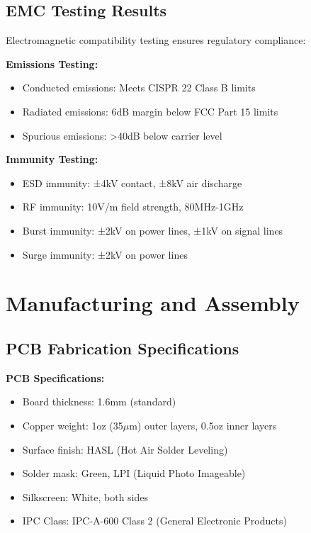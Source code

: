 \subsection{EMC Testing Results}
\label{subsec:emc_testing}

Electromagnetic compatibility testing ensures regulatory compliance:

\textbf{Emissions Testing:}
\begin{itemize}
\item Conducted emissions: Meets CISPR 22 Class B limits
\item Radiated emissions: 6dB margin below FCC Part 15 limits
\item Spurious emissions: >40dB below carrier level
\end{itemize}

\textbf{Immunity Testing:}
\begin{itemize}
\item ESD immunity: ±4kV contact, ±8kV air discharge
\item RF immunity: 10V/m field strength, 80MHz-1GHz
\item Burst immunity: ±2kV on power lines, ±1kV on signal lines
\item Surge immunity: ±2kV on power lines
\end{itemize}

\section{Manufacturing and Assembly}
\label{sec:manufacturing}

\subsection{PCB Fabrication Specifications}
\label{subsec:pcb_fabrication}

\textbf{PCB Specifications:}
\begin{itemize}
\item Board thickness: 1.6mm (standard)
\item Copper weight: 1oz (35$\mu$m) outer layers, 0.5oz inner layers
\item Surface finish: HASL (Hot Air Solder Leveling)
\item Solder mask: Green, LPI (Liquid Photo Imageable)
\item Silkscreen: White, both sides
\item IPC Class: IPC-A-600 Class 2 (General Electronic Products)
\end{itemize}

